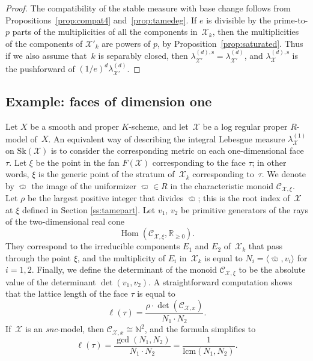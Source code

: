 \documentclass[11pt]{article}
\let\mathcal\mathscr
\theoremstyle{definition}
\numberwithin{equation}{subsection}
\newcommand{\N}{\ensuremath{\mathbb{N}}}
\newcommand{\R}{\ensuremath{\mathbb{R}}}
\newcommand{\cX}{\ensuremath{\mathscr{X}}}
\newcommand{\snc}{\textit{snc}}
\newcommand{\lcm}{\mathrm{lcm}}
\newcommand{\Sk}{\mathrm{Sk}}
\newcommand{\rs}{\mathrm{s}}
\DeclareMathOperator{\Hom}{Hom}
\let\Leb\lambda
\let\unif\varpi
\begin{document}
\begin{proof}
The compatibility of the stable measure with base change follows from Propositions~\ref{prop:compat4} and~\ref{prop:tamedeg}.
If $e$ is divisible by the prime-to-$p$ parts of the multiplicities of all the components in~$\cX_k$, then the multiplicities of the components of $\cX'_k$ are powers of $p$,
by Proposition~\ref{prop:saturated}. Thus if we also assume that~$k$ is separably closed, then $\Leb^{(d),\rs}_{\cX'}=\Leb^{(d)}_{\cX'}$, and
$\Leb^{(d),\rs}_{\cX}$ is the pushforward of $(1/e)^d\Leb^{(d)}_{\cX'}$.
\end{proof}

\subsection{Example: faces of dimension one}\label{sec:curve}
Let $X$ be a smooth and proper $K$\nobreakdash-scheme, and let~$\cX$ be a log regular proper $R$\nobreakdash-model of~$X$.
An equivalent way of describing the integral Lebesgue measure $\Leb^{(1)}_{\cX}$ on $\Sk(\cX)$
is to consider the corresponding metric on each one-dimensional face $\tau$. Let $\xi$ be the point in the fan $F(\cX)$ corresponding to the face $\tau$; in other words,
$\xi$ is the generic point of the stratum of~$\cX_k$ corresponding to~$\tau$. We denote by $\overline{\varpi}$ the image of the uniformizer $\unif\in R$ in the characteristic monoid $\mathcal{C}_{\cX,\xi}$.
Let $\rho$ be the largest positive integer that divides $\overline{\varpi}$; this is the root index of~$\cX$ at $\xi$ defined in Section \ref{ss:tamepart}.
Let $v_1$, $v_2$ be primitive generators of the rays of the two-dimensional real cone
\[
\Hom(\mathcal{C}_{\cX,\xi},\R_{\geq 0}).
\]
They correspond to the irreducible components $E_1$ and $E_2$ of~$\cX_k$ that pass through the point $\xi$, and the multiplicity of $E_i$ in~$\cX_k$ is equal to
$N_i=\langle \overline{\varpi},v_i \rangle$ for $i=1,2$. Finally, we define the determinant of the monoid $\mathcal{C}_{\cX,\xi}$ to be the absolute value of the determinant $\det(v_1,v_2)$.
A straightforward computation shows that the
lattice length of the face $\tau$ is equal to
\[
\ell(\tau)= \frac{\rho\cdot \det(\mathcal{C}_{\cX,x})}{N_1\cdot N_2}.
\]
If~$\cX$ is an \snc-model, then $\mathcal{C}_{\cX,x}\cong \N^2$, and the formula simplifies to
\[
\ell(\tau)= \frac{\gcd(N_1,N_2)}{N_1\cdot N_2}=\frac{1}{\lcm(N_1,N_2)}.
\]
\end{document}
